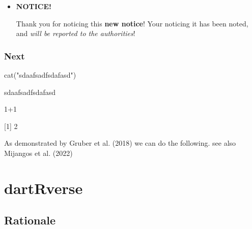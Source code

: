 \documentclass[
  letterpaper,
  DIV=11,
  numbers=noendperiod]{scrreprt}
\newenvironment{Shaded}{\begin{snugshade}}{\end{snugshade}}
\newcommand{\DecValTok}[1]{\textcolor[rgb]{0.25,0.63,0.44}{#1}}
\newcommand{\FunctionTok}[1]{\textcolor[rgb]{0.02,0.16,0.49}{#1}}
\newcommand{\NormalTok}[1]{\textcolor[rgb]{0.00,0.44,0.13}{#1}}
\newcommand{\SpecialCharTok}[1]{\textcolor[rgb]{0.25,0.44,0.63}{#1}}
\newcommand{\StringTok}[1]{\textcolor[rgb]{0.25,0.44,0.63}{#1}}
\newenvironment{infobox}[1]
  {
  \begin{blackbox}
  \begin{itemize}
  \renewcommand{\labelitemi}{
    \raisebox{-.7\height}[0pt][0pt]{
      {\setkeys{Gin}{width=3em,keepaspectratio}
        \texttt{[image: images/\#1]}}
    }
  }
  \setlength{\fboxsep}{1em}
  
  \item
  }
  {
  
  \end{itemize}
  \end{blackbox}
  }
\let\textttOrig\texttt
\renewcommand{\texttt}[1]{\textttOrig{\color{blue}{#1}}}
\begin{document}
\begin{infobox}{task}
\textbf{NOTICE!}

Thank you for noticing this \textbf{new notice}! Your noticing it has
been noted, and \emph{will be reported to the authorities}!

\end{infobox}

\hypertarget{next}{%
\subsection*{Next}\label{next}}

\begin{Shaded}
\begin{Highlighting}[]
\FunctionTok{cat}\NormalTok{(}\StringTok{"sdaafsadfsdafasd"}\NormalTok{)}
\end{Highlighting}
\end{Shaded}

\begin{Shaded}
\begin{Highlighting}[]
\NormalTok{sdaafsadfsdafasd}
\end{Highlighting}
\end{Shaded}

\begin{Shaded}
\begin{Highlighting}[]
\DecValTok{1}\SpecialCharTok{+}\DecValTok{1}
\end{Highlighting}
\end{Shaded}

\begin{Shaded}
\begin{Highlighting}[]
\NormalTok{[1] 2}
\end{Highlighting}
\end{Shaded}

As demonstrated by Gruber et al. (2018) we can do the following. see
also Mijangos et al. (2022)


\hypertarget{dartrverse}{%
\chapter*{dartRverse}\label{dartrverse}}


\hypertarget{rationale}{%
\section*{Rationale}\label{rationale}}
\end{document}
